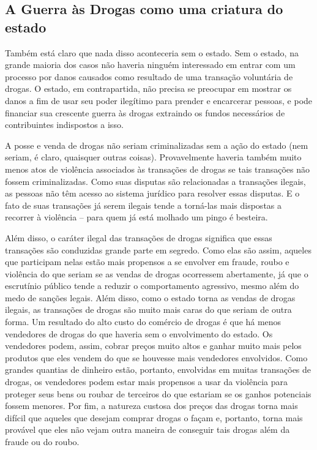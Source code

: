 \subsection*{A Guerra às Drogas como uma criatura do estado}

Também está claro que nada disso aconteceria sem o estado. Sem o estado, na grande maioria dos casos não haveria ninguém interessado em entrar com um processo por danos causados como resultado de uma transação voluntária de drogas. O estado, em contrapartida, não precisa se preocupar em mostrar os danos a fim de usar seu poder ilegítimo para prender e encarcerar pessoas, e pode financiar sua crescente guerra às drogas extraindo os fundos necessários de contribuintes indispostos a isso.

A posse e venda de drogas não seriam criminalizadas sem a ação do estado (nem seriam, é claro, quaisquer outras coisas). Provavelmente haveria também muito menos atos de violência associados às transações de drogas se tais transações não fossem criminalizadas. Como suas disputas são relacionadas a transações ilegais, as pessoas não têm acesso ao sistema jurídico para resolver essas disputas. E o fato de suas transações já serem ilegais tende a torná-las mais dispostas a recorrer à violência -- para quem já está molhado um pingo é besteira.

Além disso, o caráter ilegal das transações de drogas significa que essas transações são conduzidas grande parte em segredo. Como elas são assim, aqueles que participam nelas estão mais propensos a se envolver em fraude, roubo e violência do que seriam se as vendas de drogas ocorressem abertamente, já que o escrutínio público tende a reduzir o comportamento agressivo, mesmo além do medo de sanções legais. Além disso, como o estado torna as vendas de drogas ilegais, as transações de drogas são muito mais caras do que seriam de outra forma. Um resultado do alto custo do comércio de drogas é que há menos vendedores de drogas do que haveria sem o envolvimento do estado. Os vendedores podem, assim, cobrar preços muito altos e ganhar muito mais pelos produtos que eles vendem do que se houvesse mais vendedores envolvidos. Como grandes quantias de dinheiro estão, portanto, envolvidas em muitas transações de drogas, os vendedores podem estar mais propensos a usar da violência para proteger seus bens ou roubar de terceiros do que estariam se os ganhos potenciais fossem menores. Por fim, a natureza custosa dos preços das drogas torna mais difícil que aqueles que desejam comprar drogas o façam e, portanto, torna mais provável que eles não vejam outra maneira de conseguir tais drogas além da fraude ou do roubo.

